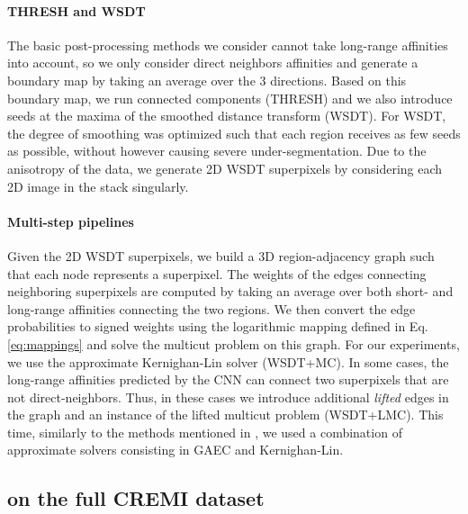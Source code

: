 \paragraph{THRESH and WSDT} The basic post-processing methods we consider cannot take long-range affinities into account, so we only consider direct neighbors affinities and generate a boundary map by taking an average over the 3 directions. Based on this boundary map, we run connected components (THRESH) and we also introduce seeds at the maxima of the smoothed distance transform (WSDT). For WSDT, the degree of smoothing was optimized such that each region receives as few seeds as possible, without however causing severe under-segmentation. Due to the anisotropy of the data, we generate 2D WSDT superpixels by considering each 2D image in the stack singularly.


\paragraph{Multi-step pipelines} Given the 2D WSDT superpixels, we build a 3D region-adjacency graph such that each node represents a superpixel. The weights of the edges connecting neighboring superpixels are computed by taking an average over both short- and long-range affinities connecting the two regions. We then convert the edge probabilities to signed weights using the logarithmic mapping defined in Eq. \ref{eq:mappings} and solve the multicut problem on this graph. For our experiments, we use the approximate Kernighan-Lin solver \cite{keuper2015efficient,kernighan1970efficient} (WSDT+MC). In some cases, the long-range affinities predicted by the CNN can connect two superpixels that are not direct-neighbors. Thus, in these cases we introduce additional \emph{lifted} edges in the graph and an instance of the lifted multicut problem (WSDT+LMC). This time, similarly to the methods mentioned in \cite{beier2016efficient}, we used a combination of approximate solvers consisting in GAEC and Kernighan-Lin. 

\subsection{\algname{} on the full CREMI dataset} \label{sec:appendix_exps_full_cremi}
